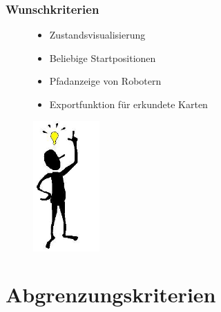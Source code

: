 \documentclass{beamer}
\begin{document}
\begin{frame}
  \frametitle{Wunschkriterien}
  	
	\begin{figure}[htbp]
	
	\begin{minipage}[t]{0.5\textwidth}
		\begin{itemize}
			\item Zustandsvisualisierung
			\item Beliebige Startpositionen
			\item Pfadanzeige von Robotern
			\item Exportfunktion für erkundete Karten
		\end{itemize}
	\end{minipage}
	\hfill
	\begin{minipage}[t]{5cm}
		\vspace{0pt}
		\includegraphics[height=5cm]{idee.jpg} 
	\end{minipage}
   \end{figure}  	
\end{frame}


\section{Abgrenzungskriterien}
\end{document}
